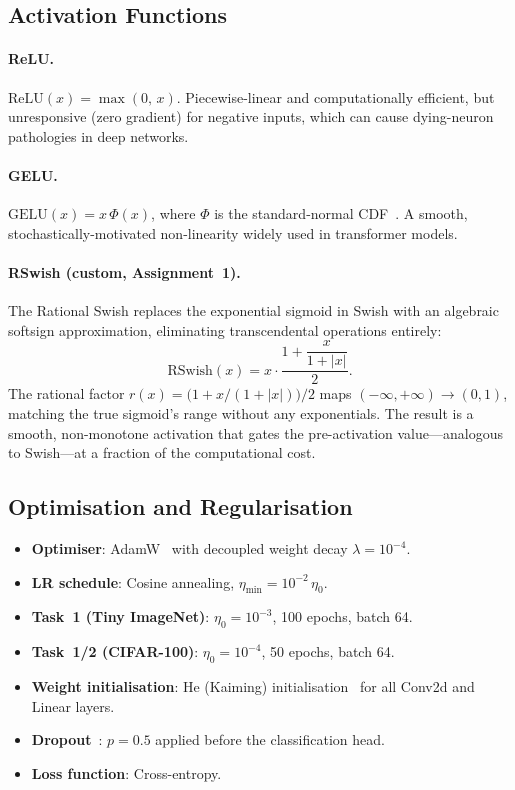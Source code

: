 \documentclass[11pt,letterpaper]{article}
\begin{document}
\subsection{Activation Functions}

\paragraph{ReLU.}
$\mathrm{ReLU}(x) = \max(0,\,x)$.
Piecewise-linear and computationally efficient, but unresponsive (zero gradient)
for negative inputs, which can cause dying-neuron pathologies in deep networks.

\paragraph{GELU.}
$\mathrm{GELU}(x) = x\,\Phi(x)$, where $\Phi$ is the standard-normal
CDF~\cite{hendrycks2016gelu}.
A smooth, stochastically-motivated non-linearity widely used in transformer models.

\paragraph{RSwish (custom, Assignment~1).}
The Rational Swish replaces the exponential sigmoid in Swish with an algebraic
softsign approximation, eliminating transcendental operations entirely:
\begin{equation}
  \mathrm{RSwish}(x)
  = x \cdot \frac{1 + \dfrac{x}{1+|x|}}{2}.
  \label{eq:rswish}
\end{equation}
The rational factor $r(x) = \bigl(1 + x/(1+|x|)\bigr)/2$ maps
$(-\infty,+\infty)\!\to\!(0,1)$, matching the true sigmoid's range without any
exponentials.
The result is a smooth, non-monotone activation that gates the pre-activation
value—analogous to Swish—at a fraction of the computational cost.

\subsection{Optimisation and Regularisation}

\begin{itemize}[noitemsep]
  \item \textbf{Optimiser}: AdamW~\cite{loshchilov2019adamw} with decoupled
        weight decay $\lambda = 10^{-4}$.
  \item \textbf{LR schedule}: Cosine annealing,
        $\eta_{\min} = 10^{-2}\,\eta_0$.
  \item \textbf{Task~1 (Tiny ImageNet)}: $\eta_0 = 10^{-3}$, 100 epochs, batch 64.
  \item \textbf{Task~1/2 (CIFAR-100)}: $\eta_0 = 10^{-4}$, 50 epochs, batch 64.
  \item \textbf{Weight initialisation}: He (Kaiming) initialisation~\cite{he2015delving}
        for all Conv2d and Linear layers.
  \item \textbf{Dropout}~\cite{srivastava2014dropout}: $p = 0.5$ applied before the classification head.
  \item \textbf{Loss function}: Cross-entropy.
\end{itemize}
\end{document}
